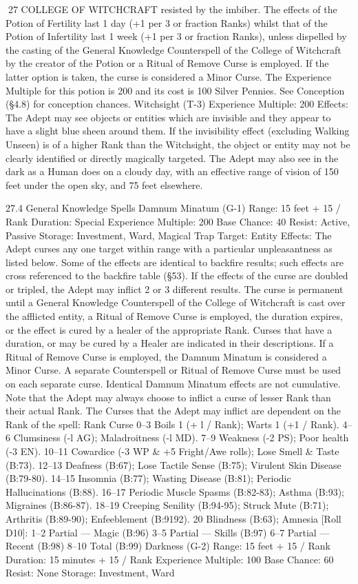 \documentclass[a4paper]{article}
\begin{document}
\begin{multicols}{3}
27 COLLEGE OF WITCHCRAFT
resisted by the imbiber. The effects of the Potion of
Fertility last 1 day (+1 per 3 or fraction Ranks)
whilst that of the Potion of Infertility last 1 week
(+1 per 3 or fraction Ranks), unless dispelled by
the casting of the General Knowledge Counterspell
of the College of Witchcraft by the creator of the
Potion or a Ritual of Remove Curse is employed. If
the latter option is taken, the curse is considered a
Minor Curse. The Experience Multiple for this
potion is 200 and its cost is 100 Silver Pennies. See
Conception (§4.8) for conception chances.
Witchsight (T-3)
Experience Multiple: 200
Effects: The Adept may see objects or entities
which are invisible and they appear to have a slight
blue sheen around them. If the invisibility effect
(excluding Walking Unseen) is of a higher Rank
than the Witchsight, the object or entity may not be
clearly identified or directly magically targeted.
The Adept may also see in the dark as a Human
does on a cloudy day, with an effective range of
vision of 150 feet under the open sky, and 75 feet
elsewhere.

27.4 General Knowledge Spells
Damnum Minatum (G-1)
Range: 15 feet + 15 / Rank
Duration: Special
Experience Multiple: 200
Base Chance: 40%
Resist: Active, Passive
Storage: Investment, Ward, Magical Trap
Target: Entity
Effects: The Adept curses any one target within
range with a particular unpleasantness as listed
below. Some of the effects are identical to backfire
results; such effects are cross referenced to the
backfire table (§53). If the effects of the curse are
doubled or tripled, the Adept may inflict 2 or 3
different results. The curse is permanent until a
General Knowledge Counterspell of the College of
Witchcraft is cast over the afflicted entity, a Ritual
of Remove Curse is employed, the duration expires, or the effect is cured by a healer of the appropriate Rank. Curses that have a duration, or may
be cured by a Healer are indicated in their descriptions. If a Ritual of Remove Curse is employed, the
Damnum Minatum is considered a Minor Curse. A
separate Counterspell or Ritual of Remove Curse
must be used on each separate curse. Identical
Damnum Minatum effects are not cumulative.
Note that the Adept may always choose to inflict a
curse of lesser Rank than their actual Rank. The
Curses that the Adept may inflict are dependent on
the Rank of the spell:
Rank Curse
0–3 Boils 1 (+ l / Rank); Warts 1 (+1 / Rank).
4–6 Clumsiness (-l AG); Maladroitness (-l MD).
7–9 Weakness (-2 PS); Poor health (-3 EN).
10–11 Cowardice (-3 WP & +5 Fright/Awe rolls);
Lose Smell & Taste (B:73).
12–13 Deafness (B:67); Lose Tactile Sense (B:75);
Virulent Skin Disease (B:79-80).
14–15 Insomnia (B:77); Wasting Disease (B:81);
Periodic Hallucinations (B:88).
16–17 Periodic Muscle Spasms (B:82-83); Asthma
(B:93); Migraines (B:86-87).
18–19 Creeping Senility (B:94-95); Struck Mute
(B:71); Arthritis (B:89-90); Enfeeblement (B:9192).
20 Blindness (B:63);
Amnesia [Roll D10]:
1–2 Partial — Magic (B:96)
3–5 Partial — Skills (B:97)
6–7 Partial — Recent (B:98)
8–10 Total (B:99)
Darkness (G-2)
Range: 15 feet + 15 / Rank
Duration: 15 minutes + 15 / Rank
Experience Multiple: 100
Base Chance: 60%
Resist: None
Storage: Investment, Ward


\end{multicols}
\end{document}
